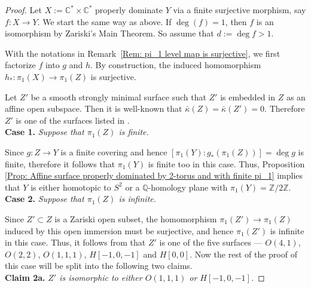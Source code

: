 \documentclass[12pt,reqno,twoside]{amsart}
\theoremstyle{definition}
\numberwithin{equation}{section}
\newcommand{\C}{\mathbb{C}}
\newcommand{\Q}{\mathbb{Q}}
\newcommand{\Z}{\mathbb{Z}}
\newcommand{\Kbar}{\bar{\kappa}}
\begin{document}
\begin{proof}
    Let $X:=\C^* \times \C^*$ properly dominate $Y$ via a finite surjective morphism, say $f: X \to Y$. We start the same way as above. If $\deg(f)=1$, then $f$ is an isomorphism by Zariski's Main Theorem. So assume that $d:=\deg f >1$.

    With the notations in Remark~\ref{Rem: pi_1 level map is surjective}, we first factorize $f$ into $g$ and $h$. By construction, the induced homomorphism $h_\ast : \pi_1(X) \to \pi_1(Z)$ is surjective. 
    
    Let $Z'$ be a smooth strongly minimal surface such that $Z'$ is embedded in $Z$ as an affine open subspace. Then it is well-known that $\Kbar(Z)=\Kbar(Z')=0.$ Therefore $Z'$ is one of the surfaces listed in \cite[Table 1]{Koj1999}.\\
    
    {\bf Case 1.} \emph{Suppose that $\pi_1(Z)$ is finite.}
    
    \medskip
    Since $g: Z \to Y$ is a finite covering and hence $[\pi_1(Y):g_\ast(\pi_1(Z))]=\deg g$ is finite, therefore it follows that $\pi_1(Y)$ is finite too in this case. Thus, Proposition \ref{Prop: Affine surface properly dominated by 2-torus and with finite pi_1} implies that $Y$ is either homotopic to $S^2$ or a $\Q$-homology plane with $\pi_1(Y)=\Z/2\Z$.\\

    {\bf Case 2.} \emph{Suppose that $\pi_1(Z)$ is infinite.}

    \medskip
    Since $Z'\subset Z$ is a Zariski open subset, the homomorphism $\pi_1(Z') \to \pi_1(Z)$ induced by this open immersion must be surjective, and hence $\pi_1(Z')$ is infinite in this case. Thus, it follows from \cite[Table 1]{Koj1999} that $Z'$ is one of the five surfaces --- $O(4,1)$, $O(2,2)$, $O(1,1,1)$, $H[-1,0,-1]$ and $H[0,0]$. Now the rest of the proof of this case will be split into the following two claims.\\
    
    {\bf Claim 2a.} \emph{$Z'$ is isomorphic to either $O(1,1,1)$ or $H[-1,0,-1]$.}
    \medskip
    

\end{proof}
\end{document}
